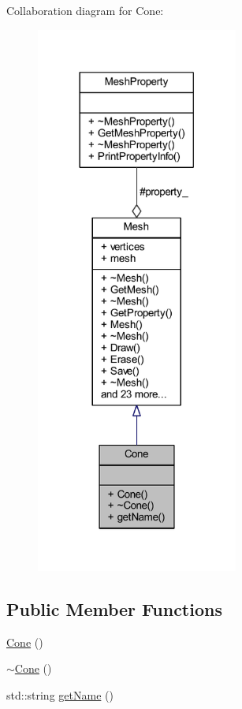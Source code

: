 Collaboration diagram for Cone\+:\nopagebreak
\begin{figure}[H]
\begin{center}
\leavevmode
\includegraphics[width=188pt]{class_cone__coll__graph}
\end{center}
\end{figure}
\subsection*{Public Member Functions}
\begin{DoxyCompactItemize}
\item 
\mbox{\hyperlink{class_cone_aec709e915b3271a750d420b14b215bfb}{Cone}} ()
\item 
\mbox{\hyperlink{class_cone_a36a6a946043f7b24a34e42cb88b5a4e8}{$\sim$\+Cone}} ()
\item 
std\+::string \mbox{\hyperlink{class_cone_a9581010134e3d1fe079fe5cce1933786}{get\+Name}} ()
\end{DoxyCompactItemize}
